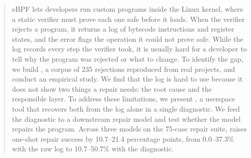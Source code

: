 \begin{abstract}
eBPF lets developers run custom programs inside the Linux kernel, where a static verifier must prove each one safe before it loads. When the verifier rejects a program, it returns a log of bytecode instructions and register states, and the error flags the operation it could not prove safe. While the log records every step the verifier took, it is usually hard for a developer to tell why the program was rejected or what to change. To identify the gap, we build \empiricalset, a corpus of 235 rejections reproduced from real projects, and conduct an empirical study. We find that the log is hard to use because it does not show two things a repair needs: the root cause and the responsible layer. To address these limitations, we present \sys, a userspace tool that recovers both from the log alone in a single diagnostic. We feed the \sys diagnostic to a downstream repair model and test whether the model repairs the program. Across three models on the 75-case \bench repair suite, \sys raises one-shot repair success by 10.7--21.4 percentage points, from 0.0--37.3\% with the raw log to 10.7--50.7\% with the \sys diagnostic.
\end{abstract}
